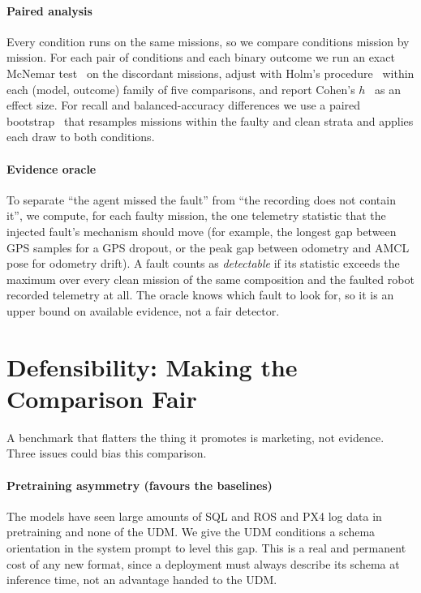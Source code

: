 \documentclass[conference]{IEEEtran}
\begin{document}
\paragraph{Paired analysis} Every condition runs on the same missions, so we
compare conditions mission by mission. For each pair of conditions and each binary
outcome we run an exact McNemar test~\cite{mcnemar1947} on the discordant missions,
adjust with Holm's procedure~\cite{holm1979} within each (model, outcome) family of
five comparisons, and report Cohen's $h$~\cite{cohen1988} as an effect size. For
recall and balanced-accuracy differences we use a paired bootstrap~\cite{efron1993}
that resamples missions within the faulty and clean strata and applies each draw to
both conditions.

\paragraph{Evidence oracle} To separate ``the agent missed the fault'' from ``the
recording does not contain it'', we compute, for each faulty mission, the one
telemetry statistic that the injected fault's mechanism should move (for example,
the longest gap between GPS samples for a GPS dropout, or the peak gap between
odometry and AMCL pose for odometry drift). A fault counts as \emph{detectable} if
its statistic exceeds the maximum over every clean mission of the same composition
and the faulted robot recorded telemetry at all. The oracle knows which fault to
look for, so it is an upper bound on available evidence, not a fair detector.

\section{Defensibility: Making the Comparison Fair}




A benchmark that flatters the thing it promotes is marketing, not evidence. Three
issues could bias this comparison.

\paragraph{Pretraining asymmetry (favours the baselines)} The models have seen large
amounts of SQL and ROS and PX4 log data in pretraining and none of the UDM. We give
the UDM conditions a schema orientation in the system prompt to level this gap.
This is a real and permanent cost of any new format, since a deployment must always
describe its schema at inference time, not an advantage handed to the UDM.
\end{document}
